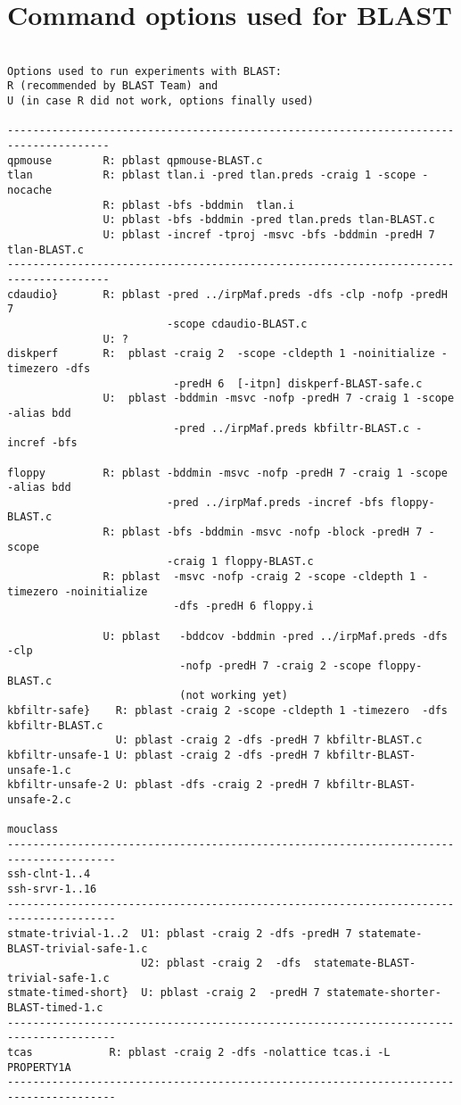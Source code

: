 \newpage
\appendix
\section{Command options used for BLAST}
\begin{verbatim}

Options used to run experiments with BLAST:  
R (recommended by BLAST Team) and 
U (in case R did not work, options finally used)

--------------------------------------------------------------------------------------
qpmouse        R: pblast qpmouse-BLAST.c  
tlan           R: pblast tlan.i -pred tlan.preds -craig 1 -scope -nocache  
               R: pblast -bfs -bddmin  tlan.i  
               U: pblast -bfs -bddmin -pred tlan.preds tlan-BLAST.c 
               U: pblast -incref -tproj -msvc -bfs -bddmin -predH 7 tlan-BLAST.c
--------------------------------------------------------------------------------------
cdaudio}       R: pblast -pred ../irpMaf.preds -dfs -clp -nofp -predH 7 
                         -scope cdaudio-BLAST.c  
               U: ? 
diskperf       R:  pblast -craig 2  -scope -cldepth 1 -noinitialize -timezero -dfs 
                          -predH 6  [-itpn] diskperf-BLAST-safe.c  
               U:  pblast -bddmin -msvc -nofp -predH 7 -craig 1 -scope -alias bdd 
                          -pred ../irpMaf.preds kbfiltr-BLAST.c -incref -bfs 

floppy         R: pblast -bddmin -msvc -nofp -predH 7 -craig 1 -scope -alias bdd
                         -pred ../irpMaf.preds -incref -bfs floppy-BLAST.c  
               R: pblast -bfs -bddmin -msvc -nofp -block -predH 7 -scope
                         -craig 1 floppy-BLAST.c  
               R: pblast  -msvc -nofp -craig 2 -scope -cldepth 1 -timezero -noinitialize 
                          -dfs -predH 6 floppy.i  

               U: pblast   -bddcov -bddmin -pred ../irpMaf.preds -dfs -clp 
                           -nofp -predH 7 -craig 2 -scope floppy-BLAST.c 
                           (not working yet) 
kbfiltr-safe}    R: pblast -craig 2 -scope -cldepth 1 -timezero  -dfs kbfiltr-BLAST.c  
                 U: pblast -craig 2 -dfs -predH 7 kbfiltr-BLAST.c 
kbfiltr-unsafe-1 U: pblast -craig 2 -dfs -predH 7 kbfiltr-BLAST-unsafe-1.c 
kbfiltr-unsafe-2 U: pblast -dfs -craig 2 -predH 7 kbfiltr-BLAST-unsafe-2.c 

mouclass
---------------------------------------------------------------------------------------
ssh-clnt-1..4
ssh-srvr-1..16   
---------------------------------------------------------------------------------------
stmate-trivial-1..2  U1: pblast -craig 2 -dfs -predH 7 statemate-BLAST-trivial-safe-1.c 
                     U2: pblast -craig 2  -dfs  statemate-BLAST-trivial-safe-1.c 
stmate-timed-short}  U: pblast -craig 2  -predH 7 statemate-shorter-BLAST-timed-1.c 
---------------------------------------------------------------------------------------
tcas            R: pblast -craig 2 -dfs -nolattice tcas.i -L PROPERTY1A  
---------------------------------------------------------------------------------------
\end{verbatim}

